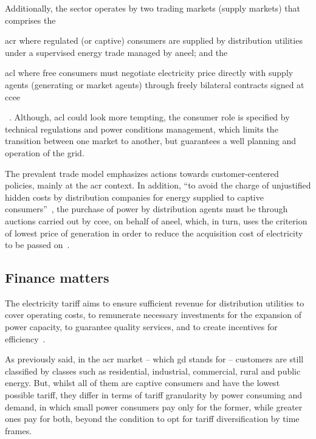 Additionally, the sector operates by two trading markets (supply markets) that comprises the
\begin{itemize*}[font=\bfseries]
	\item[\gls{acr}] where regulated (or captive) consumers are supplied by distribution utilities under a supervised energy trade managed by \gls{aneel}; and the
    \item[\gls{acl}] where free consumers must negotiate electricity price directly with supply agents (generating or market agents) through freely bilateral contracts signed at \gls{ccee}
\end{itemize*}%
~\cite{market,lud2007}.
Although, \gls{acl} could look more tempting,
the consumer role is specified by technical regulations and power conditions management, which limits the transition between one market to another, but guarantees a well planning and operation of the grid.

The prevalent trade model emphasizes actions towards customer-centered policies, mainly at the \gls{acr} context.
In addition, ``to avoid the charge of unjustified hidden costs by distribution companies for energy supplied to captive consumers''~\cite{lud2007},
the purchase of power by distribution agents must be through auctions carried out by \gls{ccee}, on behalf of \gls{aneel},
which, in turn, uses the criterion of lowest price of generation in order to reduce the acquisition cost of electricity to be passed on~\cite{modeloBR}.

\subsection*{Finance matters}

The electricity tariff aims to ensure sufficient revenue for distribution utilities
to cover operating costs,
to remunerate necessary investments for the expansion of power capacity,
to guarantee quality services,
and to create incentives for efficiency~\cite{price,tarifas}. %

As previously said, in the \gls{acr} market -- which \gls{gd} stands for -- customers are still classified by classes such as residential, industrial, commercial, rural and public energy.
But, whilst all of them are captive consumers and have the lowest possible tariff, %
they differ in terms of tariff granularity by power consuming and demand,
in which small power consumers pay only for the former, %
while greater ones pay for both, beyond the condition to opt for tariff diversification by time frames. %

